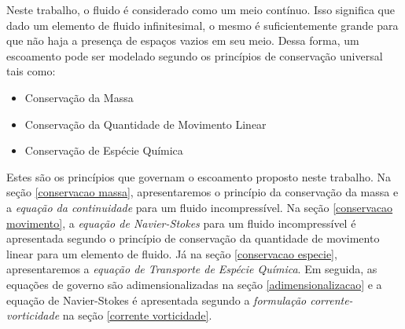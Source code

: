 Neste trabalho, o fluido é considerado como
um meio contínuo. Isso significa que dado um elemento
de fluido infinitesimal, o mesmo é suficientemente grande
para que não haja a presença de espaços vazios em seu meio.
Dessa forma, um escoamento
pode ser modelado segundo os princípios de conservação
universal tais como:

\begin{itemize}
 \item Conservação da Massa
 \item Conservação da Quantidade de Movimento Linear
 \item Conservação de Espécie Química
\end{itemize}

Estes são os princípios que governam o escoamento
proposto neste trabalho. Na seção \ref{conservacao massa},
apresentaremos o princípio da 
conservação da massa e a \textit{equação da continuidade}
para um fluido incompressível. 
Na seção \ref{conservacao movimento}, a \textit{equação de Navier-Stokes} 
para um fluido incompressível é apresentada
segundo o princípio de conservação da
quantidade de movimento linear para um elemento de fluido.
Já na seção \ref{conservacao especie}, apresentaremos a \textit{equação de Transporte
de Espécie Química}. 
Em seguida, as equações de governo são adimensionalizadas na seção \ref{adimensionalizacao}
e a equação de Navier-Stokes é apresentada
segundo a \textit{formulação corrente-vorticidade} na seção \ref{corrente vorticidade}.
